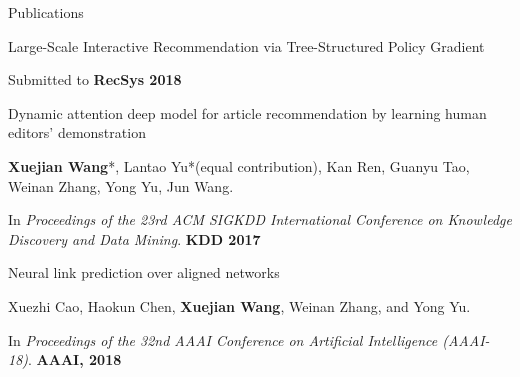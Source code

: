\documentclass{resume} %
\begin{document}
\begin{rSection}{Publications}
\begin{rSubsection}{Large-Scale Interactive Recommendation via Tree-Structured Policy Gradient}{}{}{}
\item Submitted to \textbf{RecSys 2018}
\end{rSubsection}
\begin{rSubsection}{Dynamic attention deep model for article recommendation by learning human editors' demonstration}{}{}{}
\item \textbf{Xuejian Wang}*, Lantao Yu*(equal contribution), Kan Ren, Guanyu Tao, Weinan Zhang, Yong Yu, Jun Wang.
\item In \emph{Proceedings of the 23rd ACM SIGKDD International Conference on Knowledge Discovery and Data Mining}. \textbf{KDD 2017}
\end{rSubsection}
\vspace{-5pt}
\begin{rSubsection}{Neural link prediction over aligned networks}{}{}{}
\item Xuezhi Cao, Haokun Chen, \textbf{Xuejian Wang}, Weinan Zhang, and Yong Yu.
\item In \emph{Proceedings of the 32nd AAAI Conference on Artificial Intelligence (AAAI-18)}. \textbf{AAAI, 2018}

\end{rSubsection}
\end{rSection}
\end{document}
